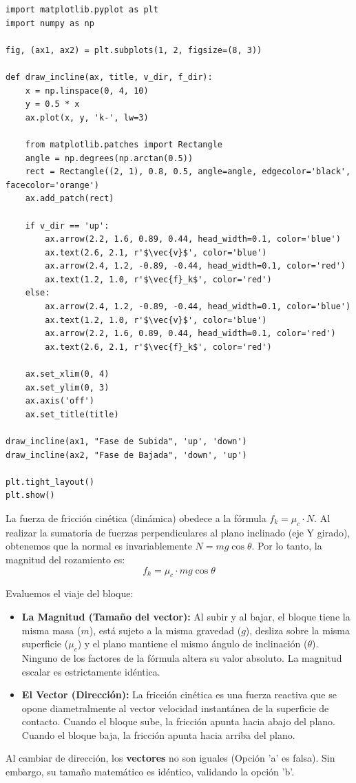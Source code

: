 \documentclass[12pt, a4paper]{article}
\begin{document}
\begin{verbatim}
import matplotlib.pyplot as plt
import numpy as np

fig, (ax1, ax2) = plt.subplots(1, 2, figsize=(8, 3))

def draw_incline(ax, title, v_dir, f_dir):
    x = np.linspace(0, 4, 10)
    y = 0.5 * x
    ax.plot(x, y, 'k-', lw=3)
    
    from matplotlib.patches import Rectangle
    angle = np.degrees(np.arctan(0.5))
    rect = Rectangle((2, 1), 0.8, 0.5, angle=angle, edgecolor='black', facecolor='orange')
    ax.add_patch(rect)
    
    if v_dir == 'up':
        ax.arrow(2.2, 1.6, 0.89, 0.44, head_width=0.1, color='blue')
        ax.text(2.6, 2.1, r'$\vec{v}$', color='blue')
        ax.arrow(2.4, 1.2, -0.89, -0.44, head_width=0.1, color='red')
        ax.text(1.2, 1.0, r'$\vec{f}_k$', color='red')
    else:
        ax.arrow(2.4, 1.2, -0.89, -0.44, head_width=0.1, color='blue')
        ax.text(1.2, 1.0, r'$\vec{v}$', color='blue')
        ax.arrow(2.2, 1.6, 0.89, 0.44, head_width=0.1, color='red')
        ax.text(2.6, 2.1, r'$\vec{f}_k$', color='red')

    ax.set_xlim(0, 4)
    ax.set_ylim(0, 3)
    ax.axis('off')
    ax.set_title(title)

draw_incline(ax1, "Fase de Subida", 'up', 'down')
draw_incline(ax2, "Fase de Bajada", 'down', 'up')

plt.tight_layout()
plt.show()
\end{verbatim}

La fuerza de fricción cinética (dinámica) obedece a la fórmula $f_k = \mu_c \cdot N$.
Al realizar la sumatoria de fuerzas perpendiculares al plano inclinado (eje Y girado), obtenemos que la normal es invariablemente $N = mg \cos\theta$.
Por lo tanto, la magnitud del rozamiento es:
$$ f_k = \mu_c \cdot mg \cos\theta $$

Evaluemos el viaje del bloque:
\begin{itemize}
    \item \textbf{La Magnitud (Tamaño del vector):} Al subir y al bajar, el bloque tiene la misma masa ($m$), está sujeto a la misma gravedad ($g$), desliza sobre la misma superficie ($\mu_c$) y el plano mantiene el mismo ángulo de inclinación ($\theta$). Ninguno de los factores de la fórmula altera su valor absoluto. La magnitud escalar es estrictamente idéntica.
    \item \textbf{El Vector (Dirección):} La fricción cinética es una fuerza reactiva que se opone diametralmente al vector velocidad instantánea de la superficie de contacto. Cuando el bloque sube, la fricción apunta hacia abajo del plano. Cuando el bloque baja, la fricción apunta hacia arriba del plano.
\end{itemize}
Al cambiar de dirección, los \textbf{vectores} no son iguales (Opción 'a' es falsa). Sin embargo, su tamaño matemático es idéntico, validando la opción 'b'.
\end{document}
